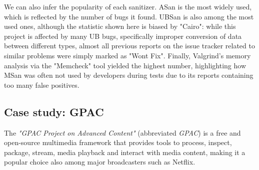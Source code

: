 We can also infer the popularity of each sanitizer. ASan is the most widely used, which is reflected by the number of bugs it found. UBSan is also among the most used ones, although the statistic shown here is biased by "Cairo": while this project is affected by many UB bugs, specifically improper conversion of data between different types, almost all previous reports on the issue tracker related to similar problems were simply marked as "Wont Fix". Finally, Valgrind's memory analysis via the "Memcheck" tool yielded the highest number, highlighting how MSan was often not used by developers during tests due to its reports containing too many false positives.



\newpage
\subsection{Case study: GPAC}
The \textit{"GPAC Project on Advanced Content"} (abbreviated \textit{GPAC}) \cite{gpac} is a free and open-source multimedia framework that provides tools to process, inspect, package, stream, media playback and interact with media content, making it a popular choice also among major broadcasters such as Netflix.

